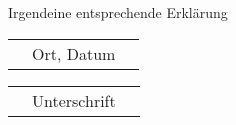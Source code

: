 


Irgendeine entsprechende Erklärung


\vspace{2.0cm}


\begin{minipage}{0.49\linewidth}
	\begin{tabular}{lcr}
		\hline
		\hspace{1.5cm} & Ort, Datum & \hspace{1.5cm}
	\end{tabular}
\end{minipage}
		\hfill
\begin{minipage}{0.4\linewidth}
	\begin{tabular}{lcr}
		\hline
		\hspace{1.5cm} & Unterschrift & \hspace{1.5cm}
	\end{tabular}		
\end{minipage}
